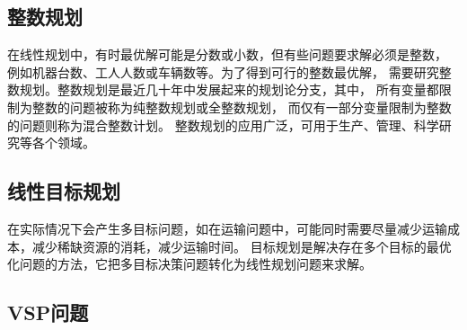 


\subsection{整数规划}

在线性规划中，有时最优解可能是分数或小数，但有些问题要求解必须是整数，
例如机器台数、工人人数或车辆数等。为了得到可行的整数最优解，
需要研究整数规划。整数规划是最近几十年中发展起来的规划论分支，其中，
所有变量都限制为整数的问题被称为纯整数规划或全整数规划，
而仅有一部分变量限制为整数的问题则称为混合整数计划。
整数规划的应用广泛，可用于生产、管理、科学研究等各个领域。

\subsection{线性目标规划}
在实际情况下会产生多目标问题，如在运输问题中，可能同时需要尽量减少运输成本，减少稀缺资源的消耗，减少运输时间。
目标规划是解决存在多个目标的最优化问题的方法，它把多目标决策问题转化为线性规划问题来求解\cite{gycx}。

\subsection{VSP问题}

